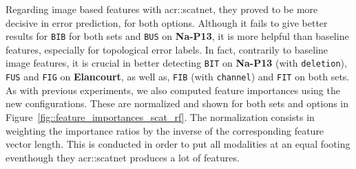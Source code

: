             Regarding image based features with \gls{acr::scatnet}, they proved to be more decisive in error prediction, for both options.
            Although it fails to give better results for \texttt{BIB} for both sets and \texttt{BUS} on \textbf{Na-P13}, it is more helpful than baseline features, especially for topological error labels.
            In fact, contrarily to baseline image features, it is crucial in better detecting \texttt{BIT} on \textbf{Na-P13} (with \texttt{deletion}), \texttt{FUS} and \texttt{FIG} on \textbf{Elancourt}, as well as, \texttt{FIB} (with \texttt{channel}) and \texttt{FIT} on both sets.\\

            As with previous experiments, we also computed feature importances using the new configurations.
            These are normalized and shown for both sets and options in Figure~\ref{fig::feature_importances_scat_rf}.
            The normalization consists in weighting the importance ratios by the inverse of the corresponding feature vector length.
            This is conducted in order to put all modalities at an equal footing eventhough they \gls{acr::scatnet} produces a lot of features.\\

